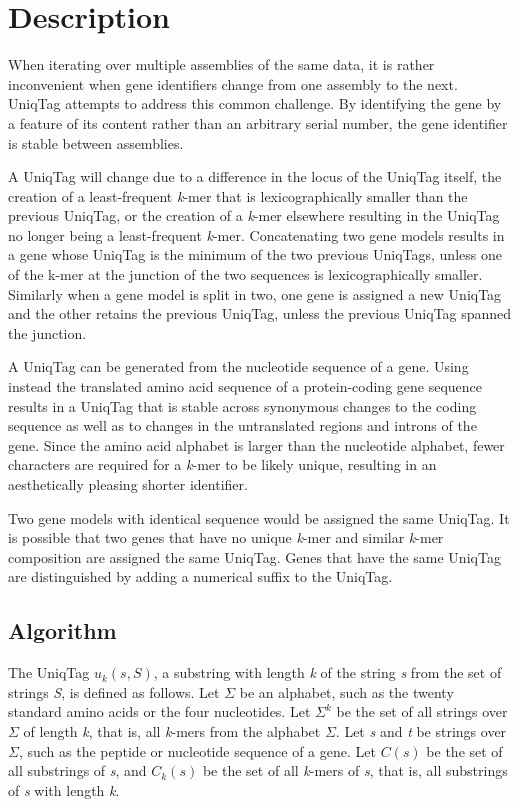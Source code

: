 \documentclass{bioinfo}
\begin{document}
\section{Description}\label{description}

When iterating over multiple assemblies of the same data, it is rather
inconvenient when gene identifiers change from one assembly to the next.
UniqTag attempts to address this common challenge. By identifying the
gene by a feature of its content rather than an arbitrary serial number,
the gene identifier is stable between assemblies.

A UniqTag will change due to a difference in the locus of the UniqTag
itself, the creation of a least-frequent \emph{k}-mer that is
lexicographically smaller than the previous UniqTag, or the creation of
a \emph{k}-mer elsewhere resulting in the UniqTag no longer being a
least-frequent \emph{k}-mer. Concatenating two gene models results in a
gene whose UniqTag is the minimum of the two previous UniqTags, unless
one of the k-mer at the junction of the two sequences is
lexicographically smaller. Similarly when a gene model is split in two,
one gene is assigned a new UniqTag and the other retains the previous
UniqTag, unless the previous UniqTag spanned the junction.

A UniqTag can be generated from the nucleotide sequence of a gene. Using
instead the translated amino acid sequence of a protein-coding gene
sequence results in a UniqTag that is stable across synonymous changes
to the coding sequence as well as to changes in the untranslated regions
and introns of the gene. Since the amino acid alphabet is larger than
the nucleotide alphabet, fewer characters are required for a
\emph{k}-mer to be likely unique, resulting in an aesthetically pleasing
shorter identifier.

Two gene models with identical sequence would be assigned the same
UniqTag. It is possible that two genes that have no unique \emph{k}-mer
and similar \emph{k}-mer composition are assigned the same UniqTag.
Genes that have the same UniqTag are distinguished by adding a numerical
suffix to the UniqTag.

\subsection*{Algorithm}\label{algorithm}

The UniqTag $u_k(s, S)$, a substring with length \emph{k} of the string
\emph{s} from the set of strings \emph{S}, is defined as follows. Let
$\Sigma$ be an alphabet, such as the twenty standard amino acids or the
four nucleotides. Let $\Sigma^k$ be the set of all strings over $\Sigma$
of length \emph{k}, that is, all \emph{k}-mers from the alphabet
$\Sigma$. Let \emph{s} and \emph{t} be strings over $\Sigma$, such as
the peptide or nucleotide sequence of a gene. Let $C(s)$ be the set of
all substrings of \emph{s}, and $C_k(s)$ be the set of all \emph{k}-mers
of \emph{s}, that is, all substrings of \emph{s} with length \emph{k}.
\end{document}
